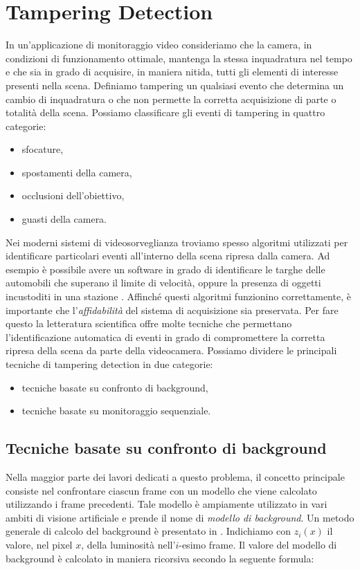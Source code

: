 \section{Tampering Detection}
In un'applicazione di monitoraggio video consideriamo che la camera, in condizioni di funzionamento ottimale, mantenga la stessa inquadratura nel tempo e che sia in grado di acquisire, in maniera nitida, tutti gli elementi di interesse presenti nella scena.
Definiamo \gls{tampering} un qualsiasi evento che determina un cambio di inquadratura o che non permette la corretta acquisizione di parte o totalit\`a della scena.
Possiamo classificare gli eventi di tampering in quattro categorie:
\begin{itemize}
	\item sfocature,
	\item spostamenti della camera,
	\item occlusioni dell'obiettivo,
	\item guasti della camera.
\end{itemize}
Nei moderni sistemi di videosorveglianza troviamo spesso algoritmi utilizzati per identificare particolari eventi all'interno della scena ripresa dalla camera. 
Ad esempio \`e possibile avere un software in grado di identificare le targhe delle automobili che superano il limite di velocit\`a, oppure la presenza di oggetti incustoditi in una stazione \cite{Targhe}.
Affinch\'e questi algoritmi funzionino correttamente, \`e importante che l'\textit{affidabilit\`a} del sistema di acquisizione sia preservata.
Per fare questo la letteratura scientifica offre molte tecniche che permettano l'identificazione automatica di eventi in grado di compromettere la corretta ripresa della scena da parte della videocamera.
Possiamo dividere le principali tecniche di tampering detection in due categorie: 
\begin{itemize}
	\item tecniche basate su confronto di background,
	\item tecniche basate su monitoraggio sequenziale.
\end{itemize}
\subsection{Tecniche basate su confronto di background}
Nella maggior parte dei lavori dedicati a questo problema, il concetto principale consiste nel confrontare ciascun frame con un modello che viene calcolato utilizzando i frame precedenti.
Tale modello \`e ampiamente utilizzato in vari ambiti di visione artificiale e prende il nome di \textit{modello di background}.
Un metodo generale di calcolo del background \`e presentato in \cite{aksay2007camera}.
Indichiamo con $z_i(x)$ il valore, nel pixel $x$, della luminosit\`a nell'$i$-esimo frame.
Il valore del modello di background \`e calcolato in maniera ricorsiva secondo la seguente formula:

